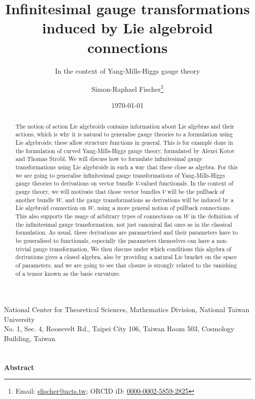 \documentclass[a4paper,oneside,11pt,leqno]{scrartcl} %
\theoremstyle{plain}
\theoremstyle{remark}
\theoremstyle{definition}
\begin{document}
\renewcommand{\thefootnote}{\fnsymbol{footnote}}

\begin{titlepage}

\author{Simon-Raphael Fischer\footnote{Email: \href{mailto:sfischer@ncts.tw}{sfischer@ncts.tw}; ORCID iD: \href{https://orcid.org/0000-0002-5859-2825}{0000-0002-5859-2825}} }
\title{Infinitesimal gauge transformations induced by Lie algebroid connections} 
\subtitle{In the context of Yang-Mills-Higgs gauge theory}
\date{\today} 
\maketitle
\thispagestyle{empty}

\begin{center}
National Center for Theoretical Sciences, Mathematics Division, National Taiwan University\\
No. 1, Sec. 4, Roosevelt Rd., Taipei City 106, Taiwan Room 503, Cosmology Building, Taiwan
\ \\
\ \\
\ \\
\textbf{Abstract}
\begin{abstract}
  \small{The notion of action Lie algebroids contains information about Lie algebras and their actions, which is why it is natural to generalise gauge theories to a formulation using Lie algebroids; these allow structure functions in general. This is for example done in the formulation of curved Yang-Mills-Higgs gauge theory, formulated by Alexei Kotov and Thomas Strobl. We will discuss how to formulate infinitesimal gauge transformations using Lie algebroids in such a way that these close as algebra. For this we are going to generalise infinitesimal gauge transformations of Yang-Mills-Higgs gauge theories to derivations on vector bundle $V$-valued functionals. In the context of gauge theory, we will motivate that those vector bundles $V$ will be the pullback of another bundle $W$, and the gauge transformations as derivations will be induced by a Lie algebroid connection on $W$, using a more general notion of pullback connections. This also supports the usage of arbitrary types of connections on $W$ in the definition of the infinitesimal gauge transformation, not just canonical flat ones as in the classical formulation. As usual, these derivations are parametrised and their parameters have to be generalised to functionals, especially the parameters themselves can have a non-trivial gauge transformation. We then discuss under which conditions this algebra of derivations gives a closed algebra, also by providing a natural Lie bracket on the space of parameters, and we are going to see that closure is strongly related to the vanishing of a tensor known as the basic curvature.
}
\end{abstract}
\end{center}
\end{titlepage}
\end{document}
